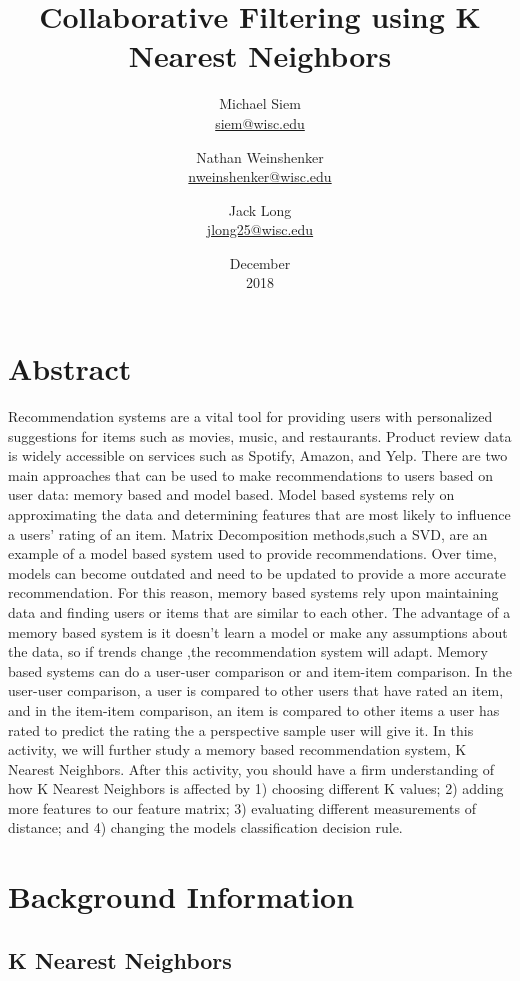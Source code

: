 \documentclass{report}
\title{Collaborative Filtering using K Nearest Neighbors}
\date{December\\ 2018}
\author{Michael Siem \\ \href{mailto:siem@wisc.edu}{siem@wisc.edu}
	\and Nathan Weinshenker \\ \href{mailto:nweinshenker@wisc.edu}{nweinshenker@wisc.edu}
	\and Jack Long \\ \href{mailto:jlong25@wisc.edu}{jlong25@wisc.edu}}
\begin{document}
\maketitle

\chapter*{Abstract}
Recommendation systems are a vital tool for providing users with personalized suggestions for items such as movies, music, and restaurants.
Product review data is widely accessible on services such as Spotify, Amazon, and Yelp.
There are two main approaches that can be used to make recommendations to users based on user data: memory based and model based.
Model based systems rely on approximating the data and determining features that are most likely to influence a users' rating of an item. 
Matrix Decomposition methods,such a SVD, are an example of a model based system used to provide recommendations.
Over time, models can become outdated and need to be updated to provide a more accurate recommendation.
For this reason, memory based systems rely upon maintaining data and finding users or items that are similar to each other.
The advantage of a memory based system is it doesn't learn a model or make any assumptions about the data, so if trends change ,the recommendation system will adapt.
Memory based systems can do a user-user comparison or and item-item comparison.
In the user-user comparison, a user is compared to other users that have rated an item, and in the item-item comparison, an item is compared to other items a user has rated to predict the rating the a perspective sample user will give it.
In this activity, we will further study a memory based recommendation system, K Nearest Neighbors. After this activity, you should have a firm understanding of how K Nearest Neighbors is affected by 1) choosing different K values; 2) adding more features to our feature matrix; 3) evaluating different measurements of distance; and 4) changing the models classification decision rule.

\chapter*{Background Information}
	
\section*{K Nearest Neighbors}
	
\end{document}
